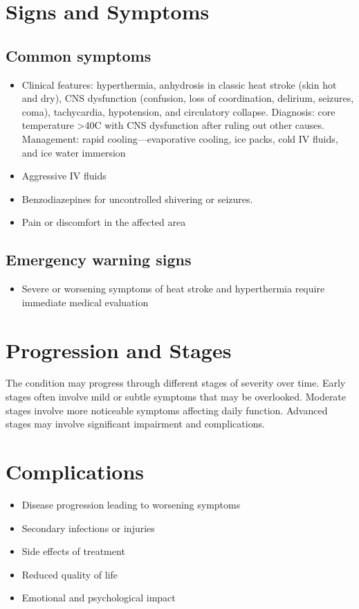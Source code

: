 \section{Signs and Symptoms}
\subsection{Common symptoms}
\begin{itemize}[noitemsep]
  \item Clinical features: hyperthermia, anhydrosis in classic heat stroke (skin hot and dry), CNS dysfunction (confusion, loss of coordination, delirium, seizures, coma), tachycardia, hypotension, and circulatory collapse. Diagnosis: core temperature >40\textdegree C with CNS dysfunction after ruling out other causes. Management: rapid cooling---evaporative cooling, ice packs, cold IV fluids, and ice water immersion
  \item Aggressive IV fluids
  \item Benzodiazepines for uncontrolled shivering or seizures.
  \item Pain or discomfort in the affected area
  \end{itemize}
\subsection{Emergency warning signs}
\begin{itemize}[noitemsep]
  \item Severe or worsening symptoms of heat stroke and hyperthermia require immediate medical evaluation
\end{itemize}
\section{Progression and Stages}
The condition may progress through different stages of severity over time. Early stages often involve mild or subtle symptoms that may be overlooked. Moderate stages involve more noticeable symptoms affecting daily function. Advanced stages may involve significant impairment and complications.
\section{Complications}
\begin{itemize}[noitemsep]
  \item Disease progression leading to worsening symptoms
  \item Secondary infections or injuries
  \item Side effects of treatment
  \item Reduced quality of life
  \item Emotional and psychological impact
\end{itemize}
